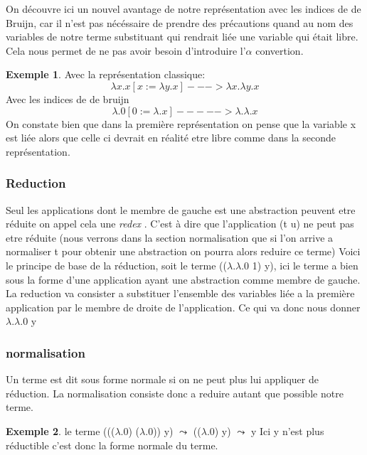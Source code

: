 \documentclass {article}
\theoremstyle{definition}
\newtheorem{example}{Exemple}
\theoremstyle{remark}
\begin{document}
On découvre ici un nouvel avantage de notre représentation avec les indices de
de Bruijn, car il n'est pas nécéssaire de prendre des précautions quand au
nom des variables de notre terme substituant %
qui rendrait liée une variable qui était libre. Cela nous permet de ne pas 
avoir besoin d'introduire l'\(\alpha\) convertion.
\begin{example}
  Avec la représentation classique: 
  \[ 
  \lambda x.x[x := \lambda y.x] ---> \lambda x.\lambda y.x
  \]
  Avec les indices de de bruijn
  \[ 
  \lambda.0[0 := \lambda.x] -----> \lambda.\lambda.x
  \]
  On constate bien que dans la première représentation on pense que la variable
  x est liée alors que celle ci devrait en réalité etre libre comme dans la 
  seconde représentation.
\end{example}

\subsubsection{Reduction}

Seul les applications dont le membre de gauche est une abstraction
peuvent etre réduite on appel cela une \emph{redex} . 
C'est à dire que l'application (t u) ne peut pas etre réduite (nous verrons
dans la section normalisation que si l'on arrive a normaliser t pour obtenir 
une abstraction on pourra alors reduire ce terme)
Voici le principe de base de la réduction, soit le terme ((\(\lambda\).\(\lambda\).0 1) y), ici
le terme a bien sous la forme d'une application ayant une abstraction comme 
membre de gauche. La reduction va consister a substituer l'ensemble des 
variables liée a la première application par le membre de droite de 
l'application. Ce qui va donc nous donner \(\lambda\).\(\lambda\).0 y




\subsubsection{normalisation}

Un terme est dit sous forme normale si on ne peut plus lui appliquer 
de réduction. La normalisation consiste donc a reduire autant que possible
notre terme.
\begin{example}
  le terme (((\(\lambda\).0) (\(\lambda\).0)) y) \(\leadsto\) ((\(\lambda\).0) y) 
\(\leadsto\) y %
  Ici y n'est plus réductible c'est donc la forme normale du terme.
\end{example}
\end{document}
